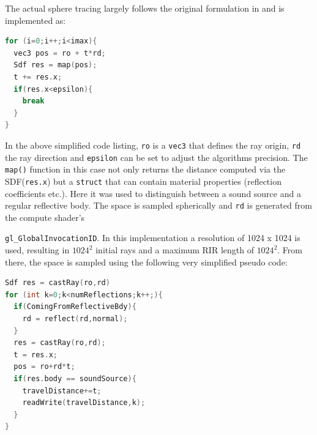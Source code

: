 \documentclass[twoside,a4paper]{article}
\begin{document}
The actual sphere tracing largely follows the original formulation in \cite{hart_sphere_1996} and is implemented as:

\begin{lstlisting}[language=C, caption={\it GLSL pseudo code for sphere tracing},captionpos=b,label=lst:sphereTrace]
for (i=0;i++;i<imax){
  vec3 pos = ro + t*rd;
  Sdf res = map(pos);
  t += res.x;
  if(res.x<epsilon){
    break
  }
}
\end{lstlisting} 

In the above simplified code listing, \texttt{ro} is a \texttt{vec3} that defines the ray origin, \texttt{rd} the ray direction and \texttt{epsilon} can be set to adjust the algorithms precision. The \texttt{map()} function in this case not only returns the distance computed via the SDF(\texttt{res.x}) but a \texttt{struct} that can contain material properties (reflection coefficients etc.). Here it was used to distinguish between a sound source and a regular reflective body.
The space is sampled spherically and \texttt{rd} is generated from the compute shader's \

 \texttt{gl\_GlobalInvocationID}. In this implementation a resolution of 1024 x 1024 is used, resulting in $1024^2$ initial rays and a maximum RIR length of $1024^2$.
From there, the space is sampled using the following very simplified pseudo code:
\begin{lstlisting}[language=C, caption={\it GLSL pseudo code for sampling the space and writing to the RIR.},captionpos=b, label=lst:mainloop]
Sdf res = castRay(ro,rd)
for (int k=0;k<numReflections;k++;){
  if(ComingFromReflectiveBdy){
    rd = reflect(rd,normal);
  }
  res = castRay(ro,rd);
  t = res.x;
  pos = ro+rd*t;
  if(res.body == soundSource){
    travelDistance+=t;
    readWrite(travelDistance,k);
  }
}

\end{lstlisting}
\end{document}
